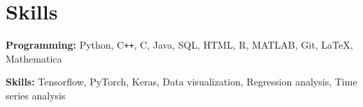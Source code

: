 \section{Skills}

\textbf{Programming:} Python, C\texttt{++}, C, Java, SQL, HTML, R, MATLAB, Git, LaTeX, Mathematica

\textbf{Skills:} Tensorflow, PyTorch, Keras, Data visualization, Regression analysis, Time series analysis

